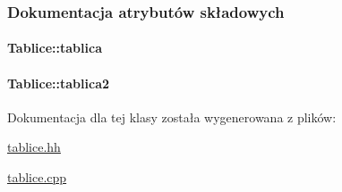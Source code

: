 \subsubsection{Dokumentacja atrybutów składowych}
\hypertarget{class_tablice_a5cbca48606b47b5cf2c688f1484264f1}{
\paragraph[{tablica}]{ Tablice\-::tablica\hspace{0.3cm}{\ttfamily [private]}}}\label{class_tablice_a5cbca48606b47b5cf2c688f1484264f1}
\hypertarget{class_tablice_a1b4bd3075acf303942b6e4d8bc1deb1f}{
\paragraph[{tablica2}]{ Tablice\-::tablica2\hspace{0.3cm}{\ttfamily [private]}}}\label{class_tablice_a1b4bd3075acf303942b6e4d8bc1deb1f}


Dokumentacja dla tej klasy została wygenerowana z plików\-:\begin{DoxyCompactItemize}
\item 
\hyperlink{tablice_8hh}{tablice.\-hh}\item 
\hyperlink{tablice_8cpp}{tablice.\-cpp}\end{DoxyCompactItemize}
